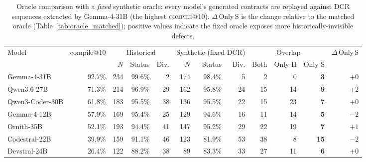 \begin{table}[t]\centering\small
\caption{Oracle comparison with a \emph{fixed} synthetic oracle: every model's generated contracts are replayed against DCR sequences extracted by Gemma-4-31B (the highest \textsc{compile@10}). $\Delta$\,Only\,S is the change relative to the matched oracle (Table~\ref{tab:oracle_matched}); positive values indicate the fixed oracle exposes more historically-invisible defects.}
\label{tab:oracle_fixed}
\begin{tabular}{l r r r r r r r r r r r}
\toprule
Model & compile@10 & \multicolumn{3}{c}{Historical} & \multicolumn{3}{c}{Synthetic (fixed DCR)} & \multicolumn{3}{c}{Overlap} & $\Delta$\,Only\,S \\
\cmidrule(lr){3-5}\cmidrule(lr){6-8}\cmidrule(lr){9-11}
 & & $N$ & Status & Div. & $N$ & Status & Div. & Both & Only H & Only S & \\
\midrule
Gemma-4-31B & 92.7\% & 234 & 99.6\% & 2 & 174 & 98.4\% & 5 & 2 & 0 & \textbf{3} & $+0$ \\
Qwen3.6-27B & 71.3\% & 214 & 96.9\% & 29 & 162 & 95.8\% & 24 & 15 & 14 & \textbf{9} & $+2$ \\
Qwen3-Coder-30B & 61.8\% & 183 & 95.5\% & 38 & 136 & 95.5\% & 22 & 15 & 23 & \textbf{7} & $+0$ \\
Gemma-4-12B & 57.9\% & 169 & 95.4\% & 25 & 129 & 94.6\% & 16 & 11 & 14 & \textbf{5} & $-2$ \\
Ornith-35B & 52.1\% & 193 & 94.4\% & 41 & 147 & 95.2\% & 29 & 22 & 19 & \textbf{7} & $+1$ \\
Codestral-22B & 39.9\% & 159 & 91.1\% & 46 & 123 & 81.9\% & 53 & 38 & 8 & \textbf{15} & $-2$ \\
Devstral-24B & 26.4\% & 122 & 88.2\% & 38 & 89 & 83.3\% & 33 & 27 & 11 & \textbf{6} & $+0$ \\
\bottomrule\end{tabular}\end{table}

